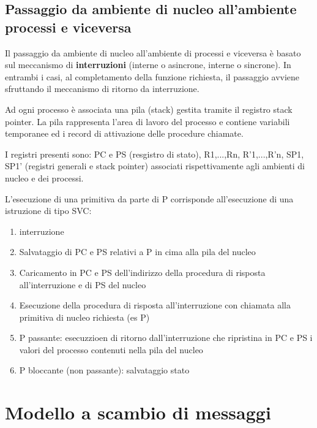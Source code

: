 \documentclass{article}
\begin{document}
\subsection{Passaggio da ambiente di nucleo all'ambiente processi e viceversa}

Il passaggio da ambiente di nucleo all'ambiente di processi e viceversa è basato sul meccanismo di \textbf{interruzioni}
(interne o asincrone, interne o sincrone). In entrambi i casi, al completamento della funzione richiesta, il passaggio
avviene sfruttando il meccanismo di ritorno da interruzione.

\vspace{3mm}
Ad ogni processo è associata una pila (stack) gestita tramite il registro stack pointer. La pila rappresenta l'area di lavoro
del processo e contiene variabili temporanee ed i record di attivazione delle procedure chiamate.

\vspace{3mm}
I registri presenti sono: PC e PS (resgistro di stato), R1,...,Rn, R'1,...,R'n, SP1, SP1' (registri generali e stack pointer)
associati rispettivamente agli ambienti di nucleo e dei processi.

\vspace{3mm}
L'esecuzione di una primitiva da parte di P corrisponde all'esecuzione di una istruzione di tipo SVC:
\begin{enumerate}
    \item interruzione
    \item Salvataggio di PC e PS relativi a P in cima alla pila del nucleo
    \item Caricamento in PC e PS dell'indirizzo della procedura di risposta all'interruzione e di PS del nucleo
    \item Esecuzione della procedura di risposta all'interruzione con chiamata alla primitiva di nucleo richiesta (es P)
    \item P passante: esecuzzioen di ritorno dall'interruzione che ripristina in PC e PS i valori del processo contenuti nella pila del nucleo
    \item P bloccante (non passante): salvataggio stato
\end{enumerate}



\section{Modello a scambio di messaggi}
\end{document}

